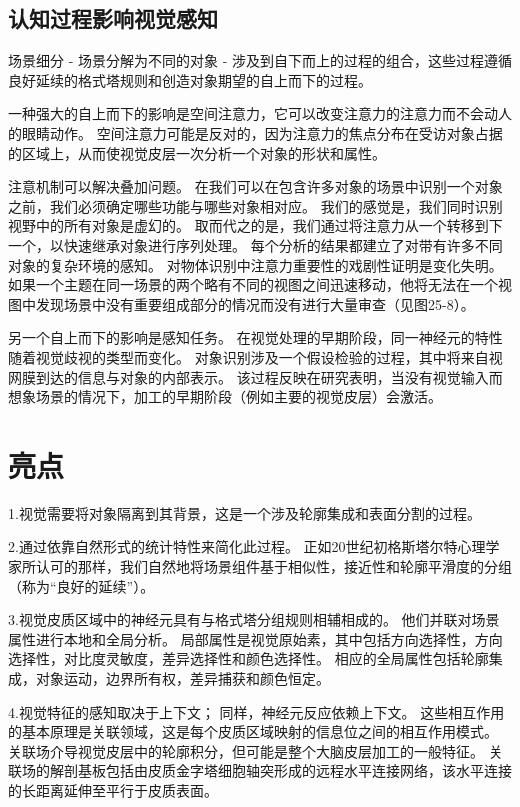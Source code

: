 \subsection{认知过程影响视觉感知}
场景细分 - 场景分解为不同的对象 - 涉及到自下而上的过程的组合，这些过程遵循良好延续的格式塔规则和创造对象期望的自上而下的过程。

一种强大的自上而下的影响是空间注意力，它可以改变注意力的注意力而不会动人的眼睛动作。 空间注意力可能是反对的，因为注意力的焦点分布在受访对象占据的区域上，从而使视觉皮层一次分析一个对象的形状和属性。

注意机制可以解决叠加问题。 在我们可以在包含许多对象的场景中识别一个对象之前，我们必须确定哪些功能与哪些对象相对应。 我们的感觉是，我们同时识别视野中的所有对象是虚幻的。 取而代之的是，我们通过将注意力从一个转移到下一个，以快速继承对象进行序列处理。 每个分析的结果都建立了对带有许多不同对象的复杂环境的感知。 对物体识别中注意力重要性的戏剧性证明是变化失明。 如果一个主题在同一场景的两个略有不同的视图之间迅速移动，他将无法在一个视图中发现场景中没有重要组成部分的情况而没有进行大量审查（见图25-8）。

另一个自上而下的影响是感知任务。 在视觉处理的早期阶段，同一神经元的特性随着视觉歧视的类型而变化。 对象识别涉及一个假设检验的过程，其中将来自视网膜到达的信息与对象的内部表示。 该过程反映在研究表明，当没有视觉输入而想象场景的情况下，加工的早期阶段（例如主要的视觉皮层）会激活。


\section{亮点}
1.视觉需要将对象隔离到其背景，这是一个涉及轮廓集成和表面分割的过程。 

2.通过依靠自然形式的统计特性来简化此过程。 正如20世纪初格斯塔尔特心理学家所认可的那样，我们自然地将场景组件基于相似性，接近性和轮廓平滑度的分组（称为“良好的延续”）。 

3.视觉皮质区域中的神经元具有与格式塔分组规则相辅相成的。 他们并联对场景属性进行本地和全局分析。 局部属性是视觉原始素，其中包括方向选择性，方向选择性，对比度灵敏度，差异选择性和颜色选择性。 相应的全局属性包括轮廓集成，对象运动，边界所有权，差异捕获和颜色恒定。 

4.视觉特征的感知取决于上下文； 同样，神经元反应依赖上下文。 这些相互作用的基本原理是关联领域，这是每个皮质区域映射的信息位之间的相互作用模式。 关联场介导视觉皮层中的轮廓积分，但可能是整个大脑皮层加工的一般特征。 关联场的解剖基板包括由皮质金字塔细胞轴突形成的远程水平连接网络，该水平连接的长距离延伸至平行于皮质表面。 

